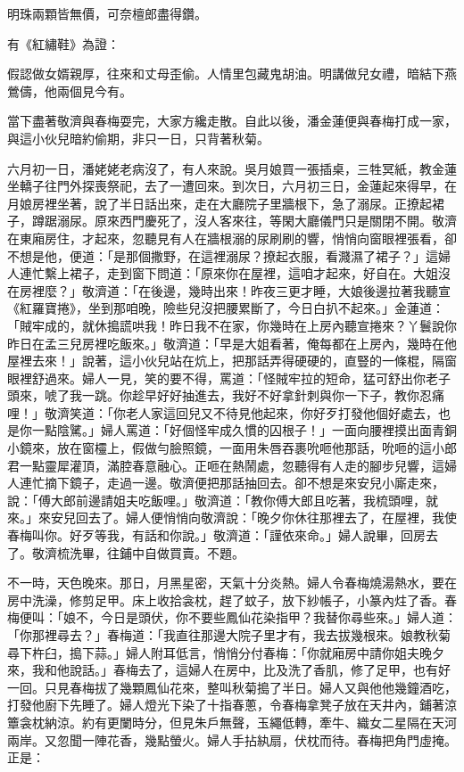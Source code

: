 \begin{showcontents}{}
明珠兩顆皆無價，可奈檀郎盡得鑽。

有《紅繡鞋》為證：

假認做女婿親厚，往來和丈母歪偷。人情里包藏鬼胡油。明講做兒女禮，暗結下燕鶯儔，他兩個見今有。

當下盡著敬濟與春梅耍完，大家方纔走散。自此以後，潘金蓮便與春梅打成一家，與這小伙兒暗約偷期，非只一日，只背著秋菊。

六月初一日，潘姥姥老病沒了，有人來說。吳月娘買一張插桌，三牲冥紙，教金蓮坐轎子往門外探喪祭祀，去了一遭回來。到次日，六月初三日，金蓮起來得早，在月娘房裡坐著，說了半日話出來，走在大廳院子里牆根下，急了溺尿。正撩起裙子，蹲踞溺尿。原來西門慶死了，沒人客來往，等閑大廳儀門只是關閉不開。敬濟在東廂房住，才起來，忽聽見有人在牆根溺的尿刷刷的響，悄悄向窗眼裡張看，卻不想是他，便道：「是那個撒野，在這裡溺尿？撩起衣服，看濺濕了裙子？」這婦人連忙繫上裙子，走到窗下問道：「原來你在屋裡，這咱才起來，好自在。大姐沒在房裡麼？」敬濟道：「在後邊，幾時出來！昨夜三更才睡，大娘後邊拉著我聽宣《紅羅寶捲》，坐到那咱晚，險些兒沒把腰累斷了，今日白扒不起來。」金蓮道：「賊牢成的，就休搗謊哄我！昨日我不在家，你幾時在上房內聽宣捲來？丫鬟說你昨日在孟三兒房裡吃飯來。」敬濟道：「早是大姐看著，俺每都在上房內，幾時在他屋裡去來！」說著，這小伙兒站在炕上，把那話弄得硬硬的，直豎的一條棍，隔窗眼裡舒過來。婦人一見，笑的要不得，罵道：「怪賊牢拉的短命，猛可舒出你老子頭來，唬了我一跳。你趁早好好抽進去，我好不好拿針刺與你一下子，教你忍痛哩！」敬濟笑道：「你老人家這回兒又不待見他起來，你好歹打發他個好處去，也是你一點陰騭。」婦人罵道：「好個怪牢成久慣的囚根子！」一面向腰裡摸出面青銅小鏡來，放在窗欞上，假做勻臉照鏡，一面用朱唇吞裹吮咂他那話，吮咂的這小郎君一點靈犀灌頂，滿腔春意融心。正咂在熱鬧處，忽聽得有人走的腳步兒響，這婦人連忙摘下鏡子，走過一邊。敬濟便把那話抽回去。卻不想是來安兒小廝走來，說：「傅大郎前邊請姐夫吃飯哩。」敬濟道：「教你傅大郎且吃著，我梳頭哩，就來。」來安兒回去了。婦人便悄悄向敬濟說：「晚夕你休往那裡去了，在屋裡，我使春梅叫你。好歹等我，有話和你說。」敬濟道：「謹依來命。」婦人說畢，回房去了。敬濟梳洗畢，往鋪中自做買賣。不題。

不一時，天色晚來。那日，月黑星密，天氣十分炎熱。婦人令春梅燒湯熱水，要在房中洗澡，修剪足甲。床上收拾衾枕，趕了蚊子，放下紗帳子，小篆內炷了香。春梅便叫：「娘不，今日是頭伏，你不要些鳳仙花染指甲？我替你尋些來。」婦人道：「你那裡尋去？」春梅道：「我直往那邊大院子里才有，我去拔幾根來。娘教秋菊尋下杵臼，搗下蒜。」婦人附耳低言，悄悄分付春梅：「你就廂房中請你姐夫晚夕來，我和他說話。」春梅去了，這婦人在房中，比及洗了香肌，修了足甲，也有好一回。只見春梅拔了幾顆鳳仙花來，整叫秋菊搗了半日。婦人又與他他幾鐘酒吃，打發他廚下先睡了。婦人燈光下染了十指春蔥，令春梅拿凳子放在天井內，鋪著涼簟衾枕納涼。約有更闌時分，但見朱戶無聲，玉繩低轉，牽牛、織女二星隔在天河兩岸。又忽聞一陣花香，幾點螢火。婦人手拈紈扇，伏枕而待。春梅把角門虛掩。正是：


\end{showcontents}
